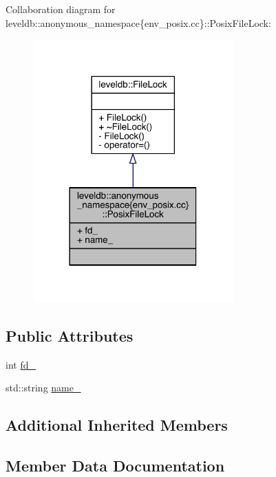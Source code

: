 Collaboration diagram for leveldb\+:\+:anonymous\+\_\+namespace\{env\+\_\+posix.\+cc\}\+:\+:Posix\+File\+Lock\+:
\nopagebreak
\begin{figure}[H]
\begin{center}
\leavevmode
\includegraphics[width=218pt]{classleveldb_1_1anonymous__namespace_02env__posix_8cc_03_1_1_posix_file_lock__coll__graph}
\end{center}
\end{figure}
\subsection*{Public Attributes}
\begin{DoxyCompactItemize}
\item 
int \hyperlink{classleveldb_1_1anonymous__namespace_02env__posix_8cc_03_1_1_posix_file_lock_a06cde7d88323d828d9b79ce42e36c879}{fd\+\_\+}
\item 
std\+::string \hyperlink{classleveldb_1_1anonymous__namespace_02env__posix_8cc_03_1_1_posix_file_lock_a39f55651895580870b1e26550321a1c9}{name\+\_\+}
\end{DoxyCompactItemize}
\subsection*{Additional Inherited Members}


\subsection{Member Data Documentation}
\hypertarget{classleveldb_1_1anonymous__namespace_02env__posix_8cc_03_1_1_posix_file_lock_a06cde7d88323d828d9b79ce42e36c879}{}
